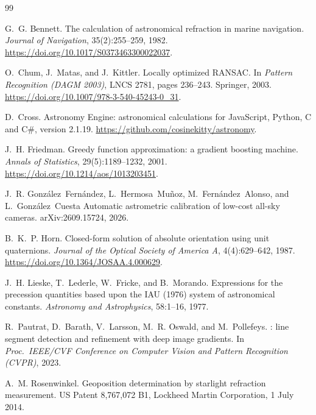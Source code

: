 \documentclass[11pt,a4paper]{article}
\newcommand{\doi}[1]{\url{https://doi.org/#1}}
\begin{document}
\begin{thebibliography}{99}\small

G.~G. Bennett.
\newblock The calculation of astronomical refraction in marine navigation.
\newblock \emph{Journal of Navigation}, 35(2):255--259, 1982.
\newblock \doi{10.1017/S0373463300022037}.

O.~Chum, J.~Matas, and J.~Kittler.
\newblock Locally optimized {RANSAC}.
\newblock In \emph{Pattern Recognition (DAGM 2003)}, LNCS 2781, pages 236--243. Springer, 2003.
\newblock \doi{10.1007/978-3-540-45243-0_31}.

D.~Cross.
\newblock Astronomy {Engine}: astronomical calculations for {JavaScript}, {Python}, {C} and {C\#}, version 2.1.19.
\newblock \url{https://github.com/cosinekitty/astronomy}.

J.~H. Friedman.
\newblock Greedy function approximation: a gradient boosting machine.
\newblock \emph{Annals of Statistics}, 29(5):1189--1232, 2001.
\newblock \doi{10.1214/aos/1013203451}.

J.~R. Gonz{\'a}lez~Fern{\'a}ndez, L.~Hermosa~Mu{\~n}oz, M.~Fern{\'a}ndez~Alonso, and L.~Gonz{\'a}lez~Cuesta
\newblock Automatic astrometric calibration of low-cost all-sky cameras.
\newblock arXiv:2609.15724, 2026.

B.~K.~P. Horn.
\newblock Closed-form solution of absolute orientation using unit quaternions.
\newblock \emph{Journal of the Optical Society of America A}, 4(4):629--642, 1987.
\newblock \doi{10.1364/JOSAA.4.000629}.

J.~H. Lieske, T.~Lederle, W.~Fricke, and B.~Morando.
\newblock Expressions for the precession quantities based upon the {IAU} (1976) system of astronomical constants.
\newblock \emph{Astronomy and Astrophysics}, 58:1--16, 1977.

R.~Pautrat, D.~Barath, V.~Larsson, M.~R. Oswald, and M.~Pollefeys.
: line segment detection and refinement with deep image gradients.
\newblock In \emph{Proc.\ IEEE/CVF Conference on Computer Vision and Pattern Recognition (CVPR)}, 2023.

A.~M. Rosenwinkel.
\newblock Geoposition determination by starlight refraction measurement.
\newblock US Patent 8{,}767{,}072 B1, Lockheed Martin Corporation, 1 July 2014.


\end{thebibliography}
\end{document}

